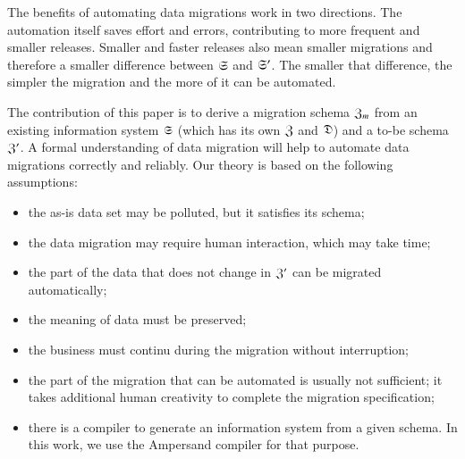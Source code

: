\documentclass{elsarticle}
\begin{document}
   The benefits of automating data migrations work in two directions.
   The automation itself saves effort and errors,
   contributing to more frequent and smaller releases.
   Smaller and faster releases also mean smaller migrations
   and therefore a smaller difference between $\mathfrak{S}$ and $\mathfrak{S}'$.
   The smaller that difference, the simpler the migration and the more of it can be automated.

   The contribution of this paper is to derive a migration schema $\mathfrak{Z}_m$ from an existing information system $\mathfrak{S}$
   (which has its own $\mathfrak{Z}$ and $\mathfrak{D}$) and a to-be schema $\mathfrak{Z}'$.
   A formal understanding of data migration will help to automate data migrations correctly and reliably.
   Our theory is based on the following assumptions:
\begin{itemize}
   \item the as-is data set may be polluted, but it satisfies its schema;
   \item the data migration may require human interaction, which may take time;
   \item the part of the data that does not change in $\mathfrak{Z}'$ can be migrated automatically;
   \item the meaning of data must be preserved;
   \item the business must continu during the migration without interruption;
   \item the part of the migration that can be automated is usually not sufficient;
         it takes additional human creativity to complete the migration specification;
   \item there is a compiler to generate an information system from a given schema.
         In this work, we use the Ampersand compiler for that purpose.
\end{itemize}
\end{document}
